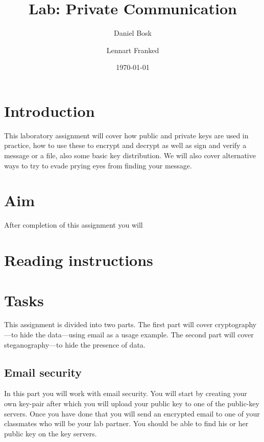 \documentclass[a4paper]{llncs}
\title{Lab: Private Communication}
\author{%
  Daniel Bosk
  \and
  Lennart Franked
}
\institute{%
  Department of Information and Communication Systems\\
  Mid Sweden University, SE-851\,70 Sundsvall\\
}
\date{\today}
\begin{document}
\maketitle


\section{Introduction}%
\label{Introduction}

This laboratory assignment will cover how public and private keys are used in 
practice, how to use these to encrypt and decrypt as well as sign and verify 
a message or a file, also some basic key distribution.
We will also cover alternative ways to try to evade prying eyes from finding
your message.


\section{Aim}%
\label{sec:Aim}

After completion of this assignment you will
\begin{itemize}
  
\end{itemize}


\section{Reading instructions}%
\label{sec:Reading}




\section{Tasks}%
\label{sec:Tasks}

This assignment is divided into two parts.
The first part will cover cryptography---to hide the data---using email as 
a usage example.
The second part will cover steganography---to hide the presence of data.

\subsection{Email security}%
\label{subsec:Email}

In this part you will work with email security.
You will start by creating your own key-pair after which you will upload your 
public key to one of the public-key servers.
Once you have done that you will send an encrypted email to one of your
classmates who will be your lab partner.
You should be able to find his or her public key on the key servers.
\end{document}
